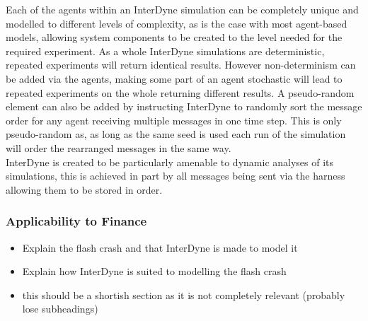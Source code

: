 \documentclass{article}
\begin{document}
Each of the agents within an InterDyne simulation can be completely unique and modelled to different levels of complexity, as is the case with most agent-based models, allowing system components to be created to the level needed for the required experiment. As a whole InterDyne simulations are deterministic, repeated experiments will return identical results. However non-determinism can be added via the agents, making some part of an agent stochastic will lead to repeated experiments on the whole returning different results. A pseudo-random element can also be added by instructing InterDyne to randomly sort the message order for any agent receiving multiple messages in one time step. This is only pseudo-random as, as long as the same seed is used each run of the simulation will order the rearranged messages in the same way.\\
InterDyne is created to be particularly amenable to dynamic analyses of its simulations, this is achieved in part by all messages being sent via the harness allowing them to be stored in order.     


\subsubsection{Applicability to Finance} \label{applicabilut_to_finance}

\begin{itemize}
  \item Explain the flash crash and that InterDyne is made to model it
  \item Explain how InterDyne is suited to modelling the flash crash 
  \item this should be a shortish section as it is not completely relevant (probably lose subheadings) 
\end{itemize}
\end{document}

